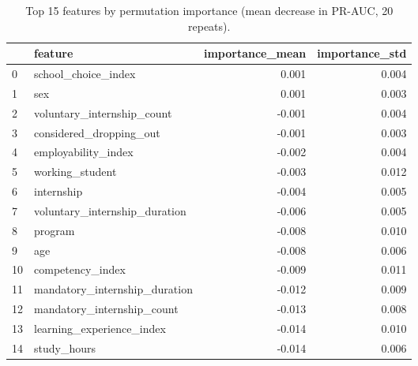 \begin{table}[htbp]
\caption{Top 15 features by permutation importance (mean decrease in PR-AUC, 20 repeats).}
\label{tab:permutation_importance_top15}
\begin{tabular}{llrr}
\toprule
 & feature & importance\_mean & importance\_std \\
\midrule
0 & school\_choice\_index & 0.001 & 0.004 \\
1 & sex & 0.001 & 0.003 \\
2 & voluntary\_internship\_count & -0.001 & 0.004 \\
3 & considered\_dropping\_out & -0.001 & 0.003 \\
4 & employability\_index & -0.002 & 0.004 \\
5 & working\_student & -0.003 & 0.012 \\
6 & internship & -0.004 & 0.005 \\
7 & voluntary\_internship\_duration & -0.006 & 0.005 \\
8 & program & -0.008 & 0.010 \\
9 & age & -0.008 & 0.006 \\
10 & competency\_index & -0.009 & 0.011 \\
11 & mandatory\_internship\_duration & -0.012 & 0.009 \\
12 & mandatory\_internship\_count & -0.013 & 0.008 \\
13 & learning\_experience\_index & -0.014 & 0.010 \\
14 & study\_hours & -0.014 & 0.006 \\
\bottomrule
\end{tabular}
\end{table}
